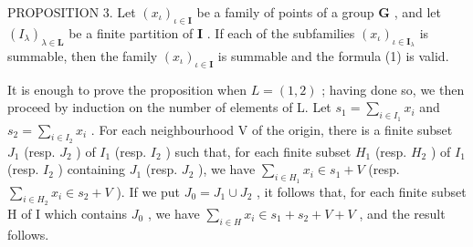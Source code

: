 PROPOSITION 3. Let \((x_{\iota})_{\iota \in \mathbf{I}}\) be a family of points of a group \(\mathbf{G}\) , and let \((I_{\lambda})_{\lambda \in \mathbf{L}}\) be a finite partition of \(\mathbf{I}\) . If each of the subfamilies \((x_{\iota})_{\iota \in \mathbf{I}_{\lambda}}\) is summable, then the family \((x_{\iota})_{\iota \in \mathbf{I}}\) is summable and the formula (1) is valid.

It is enough to prove the proposition when \(L = (1,2)\) ; having done so, we then proceed by induction on the number of elements of L. Let \(s_{1} = \sum_{i \in I_{1}} x_{i}\) and \(s_{2} = \sum_{i \in I_{2}} x_{i}\) . For each neighbourhood V of the origin, there is a finite subset \(J_{1}\) (resp. \(J_{2}\) ) of \(I_{1}\) (resp. \(I_{2}\) ) such that, for each finite subset \(H_{1}\) (resp. \(H_{2}\) ) of \(I_{1}\) (resp. \(I_{2}\) ) containing \(J_{1}\) (resp. \(J_{2}\) ), we have \(\sum_{i \in H_{1}} x_{i} \in s_{1} + V\) (resp. \(\sum_{i \in H_{2}} x_{i} \in s_{2} + V\) ). If we put \(J_{0} = J_{1} \cup J_{2}\) , it follows that, for each finite subset H of I which contains \(J_{0}\) , we have \(\sum_{i \in H} x_{i} \in s_{1} + s_{2} + V + V\) , and the result follows.

